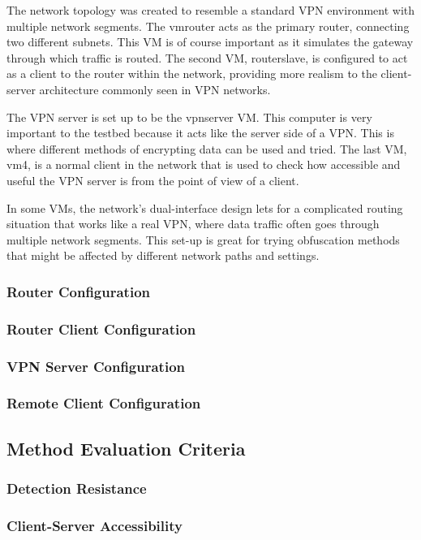 \documentclass[12pt, fleqn, a4paper]{article}
\begin{document}
The network topology was created to resemble a standard VPN environment with multiple network segments. The vmrouter acts as the primary router, connecting two different subnets. This VM is of course important as it simulates the gateway through which traffic is routed. The second VM, routerslave, is configured to act as a client to the router within the network, providing more realism to the client-server architecture commonly seen in VPN networks.

The VPN server is set up to be the vpnserver VM. This computer is very important to the testbed because it acts like the server side of a VPN. This is where different methods of encrypting data can be used and tried. The last VM, vm4, is a normal client in the network that is used to check how accessible and useful the VPN server is from the point of view of a client.

In some VMs, the network's dual-interface design lets for a complicated routing situation that works like a real VPN, where data traffic often goes through multiple network segments. This set-up is great for trying obfuscation methods that might be affected by different network paths and settings.


\subsubsection{Router Configuration}
\subsubsection{Router Client Configuration}
\subsubsection{VPN Server Configuration}
\subsubsection{Remote Client Configuration}
\subsection{Method Evaluation Criteria}
\subsubsection{Detection Resistance}
\subsubsection{Client-Server Accessibility}
\end{document}

